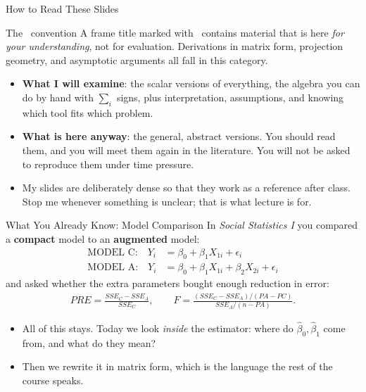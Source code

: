 \documentclass[aspectratio=169,11pt,xcolor=dvipsnames]{beamer}
\newcommand{\adv}{\,\raisebox{0.6pt}{\textcolor{accent}{$\bigstar$}}}
\begin{document}
\begin{frame}{How to Read These Slides}
\begin{alertblock}{The \adv{} convention}
A frame title marked with \adv{} contains material that is here \emph{for your
understanding}, not for evaluation. Derivations in matrix form, projection
geometry, and asymptotic arguments all fall in this category.
\end{alertblock}
\vskip4pt
\begin{itemize}\itemsep4pt
  \item \textbf{What I will examine}: the \alert{scalar} versions of everything, 
        the algebra you can do by hand with $\sum_i$ signs, plus interpretation,
        assumptions, and knowing which tool fits which problem.
  \item \textbf{What is here anyway}: the general, abstract versions. You should
        read them, and you will meet them again in the literature. You will not be
        asked to reproduce them under time pressure.
  \item My slides are deliberately dense so that they work as a reference after
        class. Stop me whenever something is unclear; that is what lecture is for.
\end{itemize}
\end{frame}

\begin{frame}{What You Already Know: Model Comparison}
In \textit{Social Statistics I} you compared a \textbf{compact} model to an
\textbf{augmented} model:
\begin{align*}
  \text{MODEL C:}\quad Y_i &= \beta_0 + \beta_1 X_{1i} + \epsilon_i \\
  \text{MODEL A:}\quad Y_i &= \beta_0 + \beta_1 X_{1i} + \beta_2 X_{2i} + \epsilon_i
\end{align*}
and asked whether the extra parameters bought enough reduction in error:
\begin{align*}
  PRE = \frac{SSE_C - SSE_A}{SSE_C},
  \qquad
  F = \frac{(SSE_C - SSE_A)/(PA - PC)}{SSE_A/(n - PA)}.
\end{align*}
\pause
\begin{itemize}
  \item All of this stays. Today we look \emph{inside} the estimator: where do
        $\hat\beta_0,\hat\beta_1$ come from, and what do they mean?
  \item Then we rewrite it in matrix form, which is the language the rest of the
        course speaks.
\end{itemize}
\end{frame}
\end{document}
